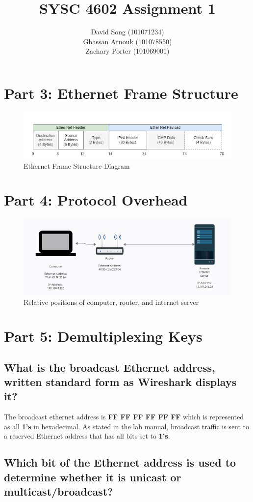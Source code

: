\documentclass{article}
\begin{document}
    \title  { \textbf{SYSC 4602 Assignment 1} }
    \author {
        David Song (101071234)\\
        Ghassan Arnouk (101078550)\\
        Zachary Porter (101069001)
    }
     
    \maketitle
    
    \clearpage
    \section*{Part 3: Ethernet Frame Structure}
    \begin{figure}[htbp]
        \centering
        \includegraphics[width=\textwidth]{images/assignment3-part3.drawio.png}
        \caption{Ethernet Frame Structure Diagram}
    \end{figure}
    \section*{Part 4: Protocol Overhead}
    \begin{figure}[htbp]
        \centering
        \includegraphics[width=\linewidth]{images/part4.png}
        \caption{Relative positions of computer, router, and internet server}
    \end{figure}
    \section*{Part 5: Demultiplexing Keys}
    \subsection*{What is the broadcast Ethernet address, written standard form as Wireshark displays it?}
    The broadcast ethernet address is {\bfseries FF FF FF FF FF FF} which is represented as all {\bfseries 1's} in hexadecimal.
    As stated in the lab manual, broadcast traffic is sent to a reserved Ethernet address that has all bits set to {\bfseries 1's}.
    \subsection*{Which bit of the Ethernet address is used to determine whether it is unicast or multicast/broadcast?}
\end{document}
